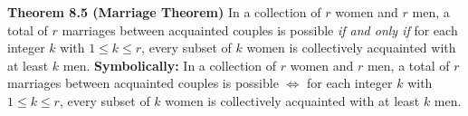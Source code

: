 \nopagenumbers
{\bf Theorem 8.5 (Marriage Theorem)}
\vskip 6pt
In a collection of $r$ women and $r$ men, a total of $r$ marriages between acquainted couples is possible {\it if and only if} for each integer $k$ with $1 \leq k \leq r$, every subset of $k$ women is collectively
acquainted with at least $k$ men.
\vskip 10pt
{\bf Symbolically:}
In a collection of $r$ women and $r$ men, a total of $r$ marriages between acquainted couples is possible $\Leftrightarrow$ for each integer $k$ with $1 \leq k \leq r$, every subset of $k$ women is collectively
acquainted with at least $k$ men.

\vfill\eject

